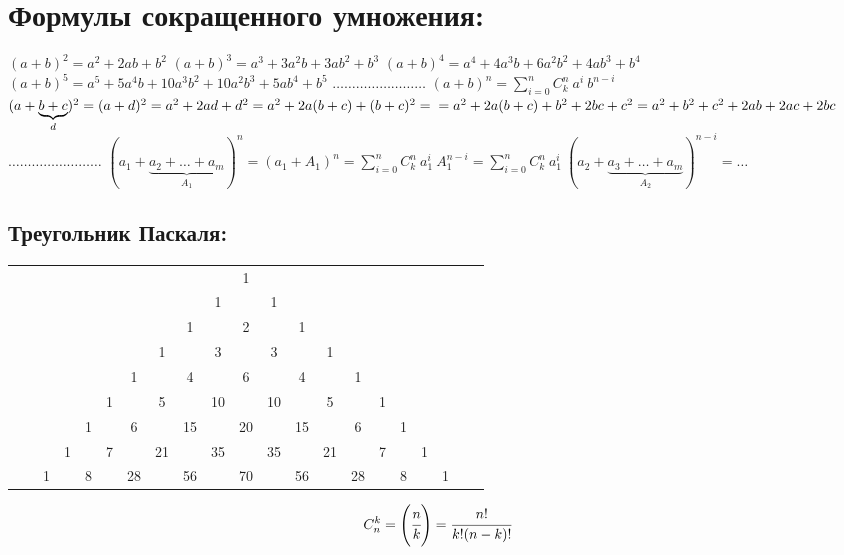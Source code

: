 \documentclass[12pt, a6paper]{extarticle}
\begin{document}
\section{Формулы сокращенного умножения:}
$(a+b)^2 = a^2+2ab+b^2$ \newline
$(a+b)^3 = a^3+3a^2b+3ab^2+b^3$ \newline
$(a+b)^4 = a^4+4a^3b+6a^2b^2+4ab^3+b^4$ \newline
$(a+b)^5 = a^5+5a^4b+10a^3b^2+10a^2b^3+5ab^4+b^5$ \newline
$\ldots\ldots\ldots\ldots\ldots\ldots\ldots\ldots$ \newline
$(a+b)^n = \sum\limits_{i=0}^{n}{C_k^n\ a^i\ b^{n-i}} $ \\ \newline
$(a+\underbrace{b+c}_{d})^2 = (a+d)^2 = a^2+2ad+d^2 = a^2+2a(b+c)+(b+c)^2 = \\ = a^2+2a(b+c)+b^2+2bc+c^2 = a^2+b^2+c^2+2ab+2ac+2bc$ \newline
$\ldots\ldots\ldots\ldots\ldots\ldots\ldots\ldots$ \newline
$(a_1+\underbrace{a_2+\ldots+a_m}_{A_1})^n = (a_1+A_1)^n = \sum\limits_{i=0}^{n}{C_k^n\ a_1^i\ A_1^{n-i}} = \sum\limits_{i=0}^{n}{C_k^n\ a_1^i\ (a_2+\underbrace{a_3+\ldots+a_m}_{A_2})^{n-i}} = \ldots $
\subsection{Треугольник Паскаля:}
\begin{center}
\begin{tabular}{ccccccccccccccccccccc}
 &  &  &  &  &  &  &  &  &  & 1  &  &  &  &  &  &  &  &  &  &  \\ 
 &  &  &  &  &  &  &  &  & 1  &  & 1  &  &  &  &  &  &  &  &  &  \\ 
 &  &  &  &  &  &  &  & 1  &  & 2  &  & 1  &  &  &  &  &  &  &  &  \\ 
 &  &  &  &  &  &  & 1  &  & 3  &  & 3  &  & 1  &  &  &  &  &  &  &  \\ 
 &  &  &  &  &  & 1  &  & 4  &  & 6  &  & 4  &  & 1  &  &  &  &  &  &  \\ 
 &  &  &  &  & 1  &  & 5  &  & 10  &  & 10  &  & 5  &  & 1  &  &  &  &  &  \\ 
 &  &  &  & 1  &  & 6  &  & 15  &  & 20  &  & 15  &  & 6  &  & 1  &  &  &  &  \\ 
 &  &  & 1  &  & 7  &  & 21  &  & 35  &  & 35  &  & 21  &  & 7  &  & 1  &  &  &  \\ 
 &  & 1  &  & 8  &  & 28  &  & 56  &  & 70  &  & 56  &  & 28  &  & 8  &  & 1  &  &  \\ 
\end{tabular}
\end{center}
$$ C_n^k = \left( \cfrac{n}{k} \right) = \cfrac{n!}{k!(n-k)!} $$
\newpage
\end{document}
